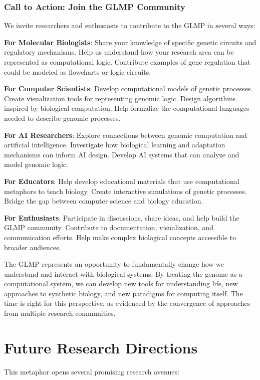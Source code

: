 \documentclass[11pt]{article}
\begin{document}
\subsubsection{Call to Action: Join the GLMP Community}

We invite researchers and enthusiasts to contribute to the GLMP in several ways:

\textbf{For Molecular Biologists}: Share your knowledge of specific genetic circuits and regulatory mechanisms. Help us understand how your research area can be represented as computational logic. Contribute examples of gene regulation that could be modeled as flowcharts or logic circuits.

\textbf{For Computer Scientists}: Develop computational models of genetic processes. Create visualization tools for representing genomic logic. Design algorithms inspired by biological computation. Help formalize the computational languages needed to describe genomic processes.

\textbf{For AI Researchers}: Explore connections between genomic computation and artificial intelligence. Investigate how biological learning and adaptation mechanisms can inform AI design. Develop AI systems that can analyze and model genomic logic.

\textbf{For Educators}: Help develop educational materials that use computational metaphors to teach biology. Create interactive simulations of genetic processes. Bridge the gap between computer science and biology education.

\textbf{For Enthusiasts}: Participate in discussions, share ideas, and help build the GLMP community. Contribute to documentation, visualization, and communication efforts. Help make complex biological concepts accessible to broader audiences.

The GLMP represents an opportunity to fundamentally change how we understand and interact with biological systems. By treating the genome as a computational system, we can develop new tools for understanding life, new approaches to synthetic biology, and new paradigms for computing itself. The time is right for this perspective, as evidenced by the convergence of approaches from multiple research communities.

\section{Future Research Directions}

This metaphor opens several promising research avenues:
\end{document}
